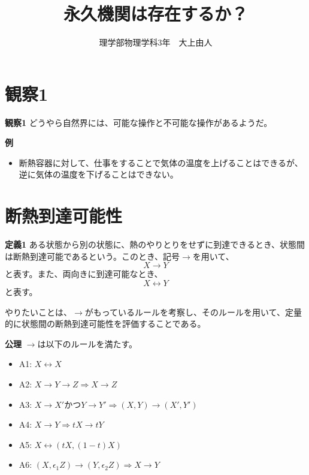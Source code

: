 \documentclass[a3paper, twocolumn, 30pt]{jsarticle}
\title{永久機関は存在するか？} %
\author{理学部物理学科3年　大上由人} %
\date{} %
\begin{document}
\maketitle %

\setlength{\columnseprule}{0.1pt} %

\section{観察1}
\begin{itembox}[l]{\textbf{観察1}}
    どうやら自然界には、可能な操作と不可能な操作があるようだ。
\end{itembox}
\textbf{例}
\begin{itemize}
    \item 断熱容器に対して、仕事をすることで気体の温度を上げることはできるが、逆に気体の温度を下げることはできない。
\end{itemize}

\section{断熱到達可能性}
\begin{itembox}[l]{\textbf{定義1}}
    ある状態から別の状態に、熱のやりとりをせずに到達できるとき、状態間は断熱到達可能であるという。このとき、記号$\rightarrow$を用いて、
    \begin{equation}
        X \rightarrow Y
    \end{equation}
    と表す。また、両向きに到達可能なとき、
    \begin{equation}
        X \leftrightarrow Y
    \end{equation}
    と表す。
\end{itembox}

やりたいことは、$\rightarrow$がもっているルールを考察し、そのルールを用いて、定量的に状態間の断熱到達可能性を評価することである。

\begin{itembox}[l]{\textbf{公理}}
    $\rightarrow$は以下のルールを満たす。
    \begin{itemize}
        \item A1: $ X \leftrightarrow X$
        \item A2: $ X \rightarrow Y \rightarrow Z \Rightarrow X \rightarrow Z$
        \item A3: $ X \rightarrow X'$かつ$Y \rightarrow Y' \Rightarrow (X,Y) \rightarrow (X',Y')$
        \item A4: $ X \rightarrow Y \Rightarrow tX \rightarrow tY$
        \item A5: $ X \leftrightarrow (tX,(1-t)X)$
        \item A6: $ (X,\epsilon_1 Z) \rightarrow (Y,\epsilon_2 Z) \Rightarrow X \rightarrow Y$
        \end{itemize}
\end{itembox}
\end{document}
